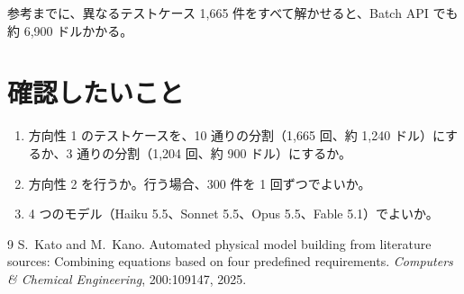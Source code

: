 \documentclass[11pt,a4paper]{ltjsarticle}
\begin{document}
参考までに、異なるテストケース 1{,}665 件をすべて解かせると、Batch API でも約 6{,}900 ドルかかる。

\section{確認したいこと}
\begin{enumerate}[leftmargin=2.2em]
  \item 方向性 1 のテストケースを、10 通りの分割（1{,}665 回、約 1{,}240 ドル）にするか、3 通りの分割（1{,}204 回、約 900 ドル）にするか。
  \item 方向性 2 を行うか。行う場合、300 件を 1 回ずつでよいか。
  \item 4 つのモデル（Haiku 5.5、Sonnet 5.5、Opus 5.5、Fable 5.1）でよいか。
\end{enumerate}

\begin{thebibliography}{9}
S.~Kato and M.~Kano.
\newblock Automated physical model building from literature sources: Combining equations based on four predefined requirements.
\newblock \emph{Computers \& Chemical Engineering}, 200:109147, 2025.
\end{thebibliography}
\end{document}

